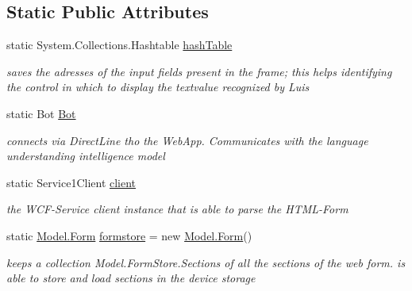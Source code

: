 \subsection*{Static Public Attributes}
\begin{DoxyCompactItemize}
\item 
static System.\+Collections.\+Hashtable \mbox{\hyperlink{class_listen_to_me_1_1_app_a311ccaa1ae0fd9cf9f89d3e3466098fe}{hash\+Table}}
\begin{DoxyCompactList}\small\item\em saves the adresses of the input fields present in the frame; this helps identifying the control in which to display the textvalue recognized by Luis \end{DoxyCompactList}\item 
static Bot \mbox{\hyperlink{class_listen_to_me_1_1_app_a2862b032c76095016dd7dc7600bfd029}{Bot}}
\begin{DoxyCompactList}\small\item\em connects via Direct\+Line tho the Web\+App. Communicates with the language understanding intelligence model \end{DoxyCompactList}\item 
static Service1\+Client \mbox{\hyperlink{class_listen_to_me_1_1_app_a41b762ac78fada5d35954d39419b8e36}{client}}
\begin{DoxyCompactList}\small\item\em the W\+C\+F-\/\+Service client instance that is able to parse the H\+T\+M\+L-\/\+Form \end{DoxyCompactList}\item 
static \mbox{\hyperlink{class_listen_to_me_1_1_model_1_1_form}{Model.\+Form}} \mbox{\hyperlink{class_listen_to_me_1_1_app_a3e094e220103fe4590cf50c22f38ee65}{formstore}} = new \mbox{\hyperlink{class_listen_to_me_1_1_model_1_1_form}{Model.\+Form}}()
\begin{DoxyCompactList}\small\item\em keeps a collection Model.\+Form\+Store.\+Sections of all the sections of the web form. is able to store and load sections in the device storage \end{DoxyCompactList}\end{DoxyCompactItemize}
